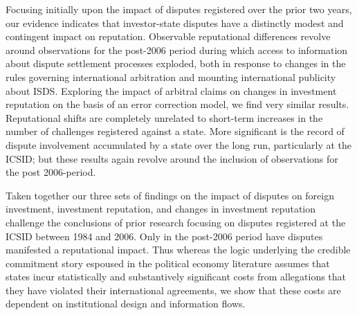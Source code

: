 \documentclass[12pt,onesided]{amsart}
\begin{document}
Focusing initially upon the impact of disputes registered over the prior two years, our evidence indicates that investor-state disputes have a distinctly modest and contingent impact on reputation. Observable reputational differences revolve around observations for the post-2006 period during which access to information about dispute settlement processes exploded, both in response to changes in the rules governing international arbitration and mounting international publicity about ISDS. Exploring the impact of arbitral claims on changes in investment reputation on the basis of an error correction model, we find very similar results. Reputational shifts are completely unrelated to short-term increases in the number of challenges registered against a state. More significant is the record of dispute involvement accumulated by a state over the long run, particularly at the ICSID; but these results again revolve around the inclusion of observations for the post 2006-period.

Taken together our three sets of findings on the impact of disputes on foreign investment, investment reputation, and changes in investment reputation challenge the conclusions of prior research focusing on disputes registered at the ICSID between 1984 and 2006. Only in the post-2006 period have disputes manifested a reputational impact. Thus whereas the logic underlying the credible commitment story espoused in the political economy literature assumes that states incur statistically and substantively significant costs from allegations that they have violated their international agreements, we show that these costs are dependent on institutional design and information flows.
\end{document}
